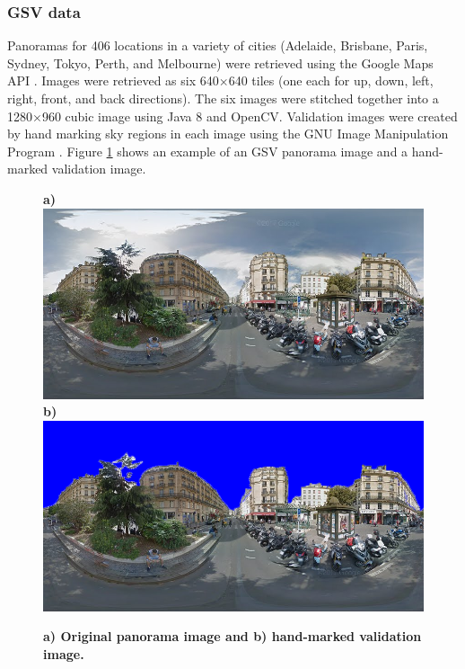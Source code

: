 \documentclass[final,3p,times,authoryear]{elsarticle}
\begin{document}
\subsubsection{GSV data}\label{sec:gsvdata}
Panoramas for 406 locations in a variety of cities (Adelaide, Brisbane, Paris, Sydney, Tokyo, Perth, and Melbourne) were retrieved using the Google Maps API \citep{GoogleMaps2017b}. Images were retrieved as six 640$\times$640 tiles (one each for up, down, left, right, front, and back directions). The six images were stitched together into a 1280$\times$960 cubic image using Java 8 \citep{Oracle2018} and OpenCV\citep {Bradski2000}. Validation images were created by hand marking sky regions in each image using the GNU Image Manipulation Program \citep{GIMP2019}. Figure \ref{fig:origmarked} shows an example of an GSV panorama image and a hand-marked validation image.

\begin{figure}
\centering    
\textbf{a)}\includegraphics[scale=0.26]{Images/2/panorama-JtVHmEl7WCiz1xJ0bcJpBg-1.png} 
\textbf{b)}\includegraphics[scale=0.26]{Images/2/panorama-JtVHmEl7WCiz1xJ0bcJpBg-1-marked.png} 

\caption{\bf a) Original panorama image and b) hand-marked validation image.}    
 \label{fig:origmarked}  
\end{figure} 
\end{document}
